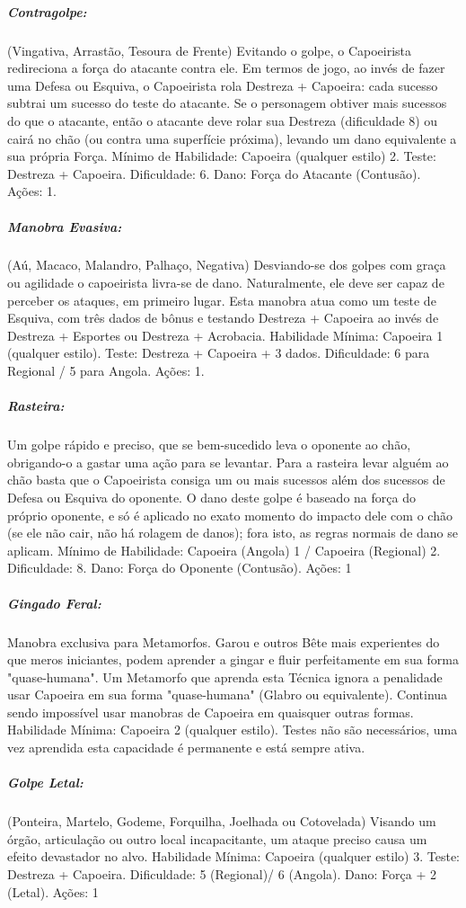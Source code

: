 \subparagraph{\bf Contragolpe:}
(Vingativa, Arrastão, Tesoura de Frente) Evitando o golpe, o Capoeirista redireciona a força do atacante contra ele. Em termos de jogo, ao invés de fazer uma Defesa ou Esquiva, o Capoeirista rola Destreza + Capoeira: cada sucesso subtrai um sucesso do teste do atacante. Se o personagem obtiver mais sucessos do que o atacante, então o atacante deve rolar sua Destreza (dificuldade 8) ou cairá no chão (ou contra uma superfície próxima), levando um dano equivalente a sua própria Força. Mínimo de Habilidade: Capoeira (qualquer estilo) 2. Teste: Destreza + Capoeira. Dificuldade: 6. Dano: Força do Atacante (Contusão). Ações: 1.

\subparagraph{\bf Manobra Evasiva:}
(Aú, Macaco, Malandro, Palhaço, Negativa) Desviando-se dos golpes com graça ou agilidade o capoeirista livra-se de dano. Naturalmente, ele deve ser capaz de perceber os ataques, em primeiro lugar. Esta manobra atua como um teste de Esquiva, com três dados de bônus e testando Destreza + Capoeira ao invés de Destreza + Esportes ou Destreza + Acrobacia. Habilidade Mínima: Capoeira 1 (qualquer estilo). Teste: Destreza + Capoeira + 3 dados. Dificuldade: 6 para Regional / 5 para Angola. Ações: 1.

\subparagraph{\bf Rasteira:}
Um golpe rápido e preciso, que se bem-sucedido leva o oponente ao chão, obrigando-o a gastar uma ação para se levantar. Para a rasteira levar alguém ao chão basta que o Capoeirista consiga um ou mais sucessos além dos sucessos de Defesa ou Esquiva do oponente. O dano deste golpe é baseado na força do próprio oponente, e só é aplicado no exato momento do impacto dele com o chão (se ele não cair, não há rolagem de danos); fora isto, as regras normais de dano se aplicam. Mínimo de Habilidade: Capoeira (Angola) 1 / Capoeira (Regional) 2. Dificuldade: 8. Dano: Força do Oponente (Contusão). Ações: 1

\subparagraph{\bf Gingado Feral:}
Manobra exclusiva para Metamorfos. Garou e outros Bête mais experientes do que meros iniciantes, podem aprender a gingar e fluir perfeitamente em sua forma "quase-humana". Um Metamorfo que aprenda esta Técnica ignora a penalidade usar Capoeira em sua forma "quase-humana" (Glabro ou equivalente). Continua sendo impossível usar manobras de Capoeira em quaisquer outras formas. Habilidade Mínima: Capoeira 2 (qualquer estilo). Testes não são necessários, uma vez aprendida esta capacidade é permanente e está sempre ativa.

\subparagraph{\bf Golpe Letal:}
(Ponteira, Martelo, Godeme, Forquilha, Joelhada ou Cotovelada) Visando um órgão, articulação ou outro local incapacitante, um ataque preciso causa um efeito devastador no alvo. Habilidade Mínima: Capoeira (qualquer estilo) 3. Teste: Destreza + Capoeira. Dificuldade: 5 (Regional)/ 6 (Angola). Dano: Força + 2 (Letal). Ações: 1


